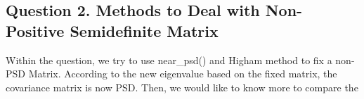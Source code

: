 \documentclass[a4paper,12pt]{article}
\begin{document}
\newpage
\subsection*{Question 2. Methods to Deal with Non-Positive Semidefinite Matrix}
Within the question, we try to use near\_psd() and Higham method to fix a non-PSD Matrix. According to the new eigenvalue based on the fixed matrix, the covariance matrix is now PSD. Then, we would like to know more to compare the  
\begin{figure}[!htbp]
    \\
    \\

\end{figure}
\end{document}
